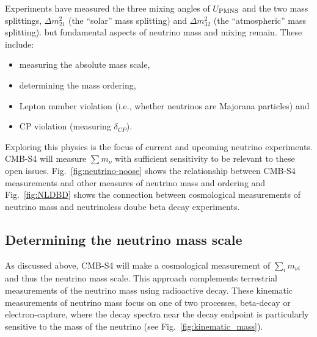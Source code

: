 Experiments have measured the three mixing angles of $U_{\rm PMNS}$ and the two mass splittings, $\Delta m^2_{21}$ (the ``solar'' mass splitting) and $\Delta m^2_{32}$ (the ``atmospheric'' mass splitting). but fundamental aspects of neutrino mass and mixing remain. These include:
\begin{itemize}
\item measuring the absolute mass scale,
\item determining the mass ordering,
\item Lepton number violation (i.e., whether neutrinos are Majorana particles) and
\item CP violation (measuring $\delta_{CP}$).
\end{itemize}
Exploring this physics is the focus of current and upcoming neutrino experiments. CMB-S4 will measure $ \sum m_\nu $ with sufficient sensitivity to be relevant to these open issues. Fig.~\ref{fig:neutrino-noose} shows the relationship between CMB-S4 measurements and other measures of neutrino mass and ordering and Fig.~\ref{fig:NLDBD} shows the connection between cosmological measurements of neutrino mass and neutrinoless doube beta decay experiments. 

\subsection{Determining the neutrino mass scale}
As discussed above, CMB-S4 will make a cosmological measurement of $\sum_i m_{\nu i}$ and thus the neutrino mass scale. This approach complements terrestrial measurements of the neutrino mass using radioactive decay. These kinematic measurements of neutrino mass focus on one of two processes, beta-decay or electron-capture, where the decay spectra near the decay endpoint is particularly sensitive to the mass of the neutrino (see Fig.~\ref{fig:kinematic_mass}).

